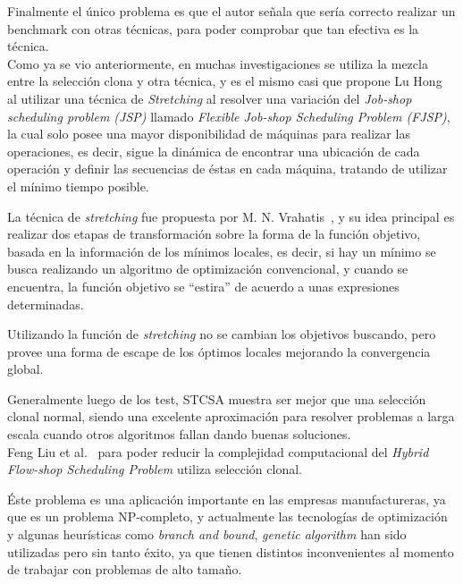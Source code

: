 Finalmente el único problema es que el autor señala que sería correcto realizar un benchmark con otras técnicas,
para poder comprobar que tan efectiva es la técnica.\\


Como ya se vio anteriormente, en muchas investigaciones se utiliza la mezcla entre la selección clona y otra técnica,
y es el mismo casi que propone Lu Hong~\cite{jobshop} al utilizar una técnica de \emph{Stretching} al resolver
una variación del \emph{Job-shop scheduling problem (JSP)} llamado \emph{Flexible Job-shop Scheduling Problem (FJSP)},
la cual solo posee una mayor disponibilidad de máquinas para realizar las operaciones, es decir, sigue la dinámica
de encontrar una ubicación de cada operación y definir las secuencias de éstas en cada máquina, tratando de utilizar el mínimo
tiempo posible.

La técnica de \emph{stretching} fue propuesta por M. N. Vrahatis~\cite{stretching},
y su idea principal es realizar dos etapas de transformación sobre la forma de la función objetivo,
basada en la información de los mínimos locales, es decir, si hay un mínimo se busca realizando un algoritmo
de optimización convencional, y cuando se encuentra, la función objetivo se ``estira'' de acuerdo a unas expresiones determinadas.

Utilizando la función de \emph{stretching} no se cambian los objetivos buscando, pero provee una forma de escape
de los óptimos locales mejorando la convergencia global.

Generalmente luego de los test, STCSA muestra ser mejor que una selección clonal normal,
siendo una excelente aproximación para resolver problemas a larga escala cuando otros algoritmos fallan dando buenas soluciones.\\


Feng Liu et al.~\cite{flowshop} para poder reducir la complejidad computacional del
\emph{Hybrid Flow-shop Scheduling Problem} utiliza selección clonal.

Éste problema es una aplicación importante en las empresas manufactureras, ya que es un problema NP-completo,
y actualmente las tecnologías de optimización y algunas heurísticas como \emph{branch and bound}, \emph{genetic algorithm}
han sido utilizadas pero sin tanto éxito, ya que tienen distintos inconvenientes al momento de trabajar con problemas
de alto tamaño.

